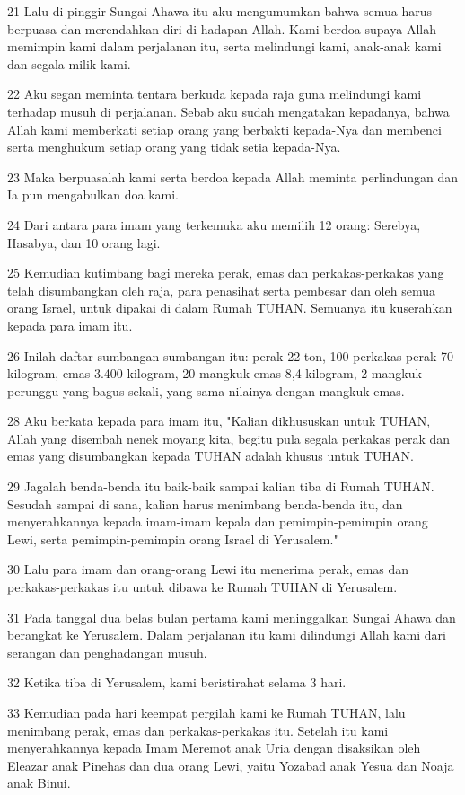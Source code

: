 \par 21 Lalu di pinggir Sungai Ahawa itu aku mengumumkan bahwa semua harus berpuasa dan merendahkan diri di hadapan Allah. Kami berdoa supaya Allah memimpin kami dalam perjalanan itu, serta melindungi kami, anak-anak kami dan segala milik kami.
\par 22 Aku segan meminta tentara berkuda kepada raja guna melindungi kami terhadap musuh di perjalanan. Sebab aku sudah mengatakan kepadanya, bahwa Allah kami memberkati setiap orang yang berbakti kepada-Nya dan membenci serta menghukum setiap orang yang tidak setia kepada-Nya.
\par 23 Maka berpuasalah kami serta berdoa kepada Allah meminta perlindungan dan Ia pun mengabulkan doa kami.
\par 24 Dari antara para imam yang terkemuka aku memilih 12 orang: Serebya, Hasabya, dan 10 orang lagi.
\par 25 Kemudian kutimbang bagi mereka perak, emas dan perkakas-perkakas yang telah disumbangkan oleh raja, para penasihat serta pembesar dan oleh semua orang Israel, untuk dipakai di dalam Rumah TUHAN. Semuanya itu kuserahkan kepada para imam itu.
\par 26 Inilah daftar sumbangan-sumbangan itu: perak-22 ton, 100 perkakas perak-70 kilogram, emas-3.400 kilogram, 20 mangkuk emas-8,4 kilogram, 2 mangkuk perunggu yang bagus sekali, yang sama nilainya dengan mangkuk emas.
\par 28 Aku berkata kepada para imam itu, "Kalian dikhususkan untuk TUHAN, Allah yang disembah nenek moyang kita, begitu pula segala perkakas perak dan emas yang disumbangkan kepada TUHAN adalah khusus untuk TUHAN.
\par 29 Jagalah benda-benda itu baik-baik sampai kalian tiba di Rumah TUHAN. Sesudah sampai di sana, kalian harus menimbang benda-benda itu, dan menyerahkannya kepada imam-imam kepala dan pemimpin-pemimpin orang Lewi, serta pemimpin-pemimpin orang Israel di Yerusalem."
\par 30 Lalu para imam dan orang-orang Lewi itu menerima perak, emas dan perkakas-perkakas itu untuk dibawa ke Rumah TUHAN di Yerusalem.
\par 31 Pada tanggal dua belas bulan pertama kami meninggalkan Sungai Ahawa dan berangkat ke Yerusalem. Dalam perjalanan itu kami dilindungi Allah kami dari serangan dan penghadangan musuh.
\par 32 Ketika tiba di Yerusalem, kami beristirahat selama 3 hari.
\par 33 Kemudian pada hari keempat pergilah kami ke Rumah TUHAN, lalu menimbang perak, emas dan perkakas-perkakas itu. Setelah itu kami menyerahkannya kepada Imam Meremot anak Uria dengan disaksikan oleh Eleazar anak Pinehas dan dua orang Lewi, yaitu Yozabad anak Yesua dan Noaja anak Binui.
